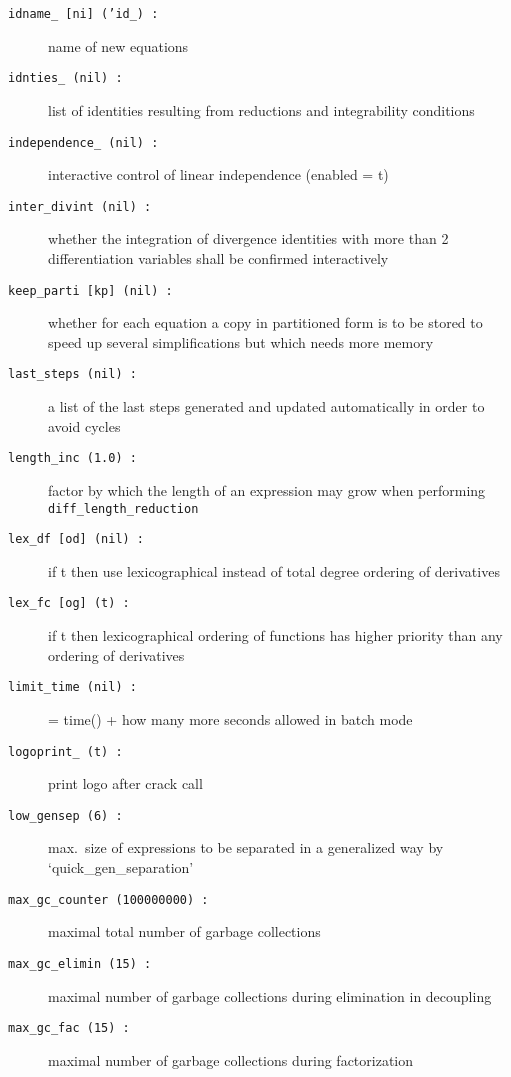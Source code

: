 \documentclass[12pt]{article}
\begin{document}
\begin{description}
\item[{\tt idname\_ [ni] ('id\_) :}] name of new equations
\item[{\tt idnties\_ (nil) :}] list of identities resulting from reductions and
                    integrability conditions
\item[{\tt independence\_ (nil) :}] interactive control of linear 
                                    independence (enabled = t)
\item[{\tt inter\_divint (nil) :}] whether the integration of divergence 
                   identities with more than 2 differentiation variables 
                   shall be confirmed interactively
\item[{\tt keep\_parti [kp] (nil) :}] whether for each equation a copy
                    in partitioned form is to be stored to speed up
                    several simplifications but which needs more memory
\item[{\tt last\_steps (nil) :}] a list of the last steps generated and updated 
                   automatically in order to avoid cycles
\item[{\tt length\_inc (1.0) :}] factor by which the length of an 
                    expression may grow when performing 
                    {\tt diff\_length\_reduction}
\item[{\tt lex\_df [od] (nil) :}] if t then use lexicographical
                    instead of total degree ordering of derivatives 
\item[{\tt lex\_fc [og] (t) :}] if t then lexicographical ordering of
                    functions has higher priority than any ordering of
                    derivatives 
\item[{\tt limit\_time (nil) :}] = time() + how many more seconds allowed in batch mode
\item[{\tt logoprint\_ (t) :}] print logo after crack call
\item[{\tt low\_gensep (6) :}] max.\ size of expressions to be separated in a 
                    generalized way by \\ `quick\_gen\_separation'
\item[{\tt max\_gc\_counter (100000000) :}] maximal total number of garbage collections
\item[{\tt max\_gc\_elimin (15) :}] maximal number of garbage collections during
                    elimination in decoupling
\item[{\tt max\_gc\_fac (15) :}] maximal number of garbage collections during factorization

\end{description}
\end{document}
